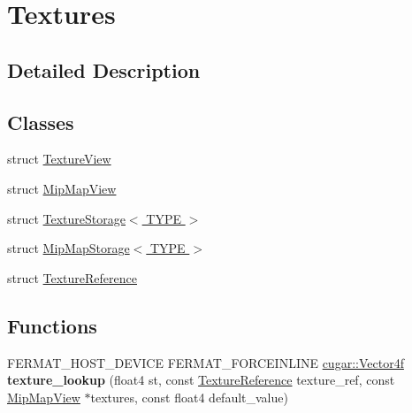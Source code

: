 \hypertarget{group___textures}{}\section{Textures}
\label{group___textures}


\subsection{Detailed Description}
\subsection*{Classes}
\begin{DoxyCompactItemize}
\item 
struct \hyperlink{struct_texture_view}{Texture\+View}
\item 
struct \hyperlink{struct_mip_map_view}{Mip\+Map\+View}
\item 
struct \hyperlink{struct_texture_storage}{Texture\+Storage$<$ T\+Y\+P\+E $>$}
\item 
struct \hyperlink{struct_mip_map_storage}{Mip\+Map\+Storage$<$ T\+Y\+P\+E $>$}
\item 
struct \hyperlink{struct_texture_reference}{Texture\+Reference}
\end{DoxyCompactItemize}
\subsection*{Functions}
\begin{DoxyCompactItemize}
\item 
\mbox{\label{group___textures_ga80c6b2d36a2a58dd91a11fff93f40937}} 
F\+E\+R\+M\+A\+T\+\_\+\+H\+O\+S\+T\+\_\+\+D\+E\+V\+I\+CE F\+E\+R\+M\+A\+T\+\_\+\+F\+O\+R\+C\+E\+I\+N\+L\+I\+NE \hyperlink{structcugar_1_1_vector}{cugar\+::\+Vector4f} {\bfseries texture\+\_\+lookup} (float4 st, const \hyperlink{struct_texture_reference}{Texture\+Reference} texture\+\_\+ref, const \hyperlink{struct_mip_map_view}{Mip\+Map\+View} $\ast$textures, const float4 default\+\_\+value)
\end{DoxyCompactItemize}
